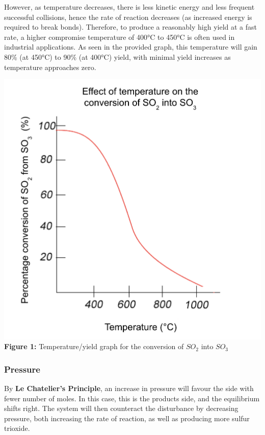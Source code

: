 \documentclass[12pt, a4paper]{article}
\begin{document}
However, as temperature decreases, there is less kinetic energy and less frequent successful collisions, hence the rate of reaction decreases (as increased energy is required to break bonds). Therefore, to produce a reasonably high yield at a fast rate, a higher compromise temperature of 400°C to 450°C is often used in industrial applications. As seen in the provided graph, this temperature will gain 80\% (at 450°C) to 90\% (at 400°C) yield, with minimal yield increases as temperature approaches zero.

\begin{center}
\includegraphics[scale=0.5]{graph}
\\
\textbf{Figure 1:} Temperature/yield graph for the conversion of \(SO_{2}\) into \(SO_{3}\)
\end{center}






\subsubsection{Pressure}

By \textbf{Le Chatelier's Principle}, an increase in pressure will favour the side with fewer number of moles. In this case, this is the products side, and the equilibrium shifts right. The system will then counteract the disturbance by decreasing pressure, both increasing the rate of reaction, as well as producing more sulfur trioxide.
\end{document}
